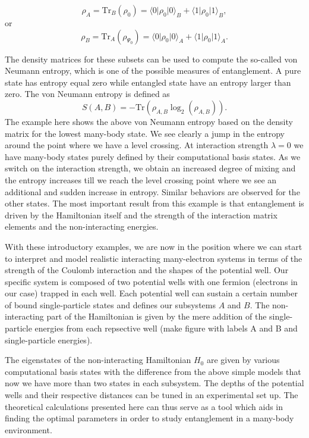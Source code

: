 \documentclass[twocolumn,superscriptaddress,unsortedaddress,
 amsmath,amssymb,
 aps,
]{revtex4-2}
\begin{document}
\[
\rho_A=\mathrm{Tr}_B(\rho_{0})=\langle 0 \vert \rho_{0} \vert 0\rangle_{B}+\langle 1 \vert \rho_{0} \vert 1\rangle_{B},
\]
or
\[
\rho_B=\mathrm{Tr}_A(\rho_{\Psi_0})=\langle 0 \vert \rho_{0} \vert 0\rangle_{A}+\langle 1 \vert \rho_{0} \vert 1\rangle_{A}.
\]

The density matrices for these subsets can be used to compute the
so-called von Neumann entropy, which is one of the possible measures
of entanglement. A pure state has entropy equal zero while entangled
state have an entropy larger than zero. The von Neumann entropy is
defined as
\[
S(A,B)=-\mathrm{Tr}\left(\rho_{A,B}\log_2 (\rho_{A,B})\right).
\]
The example here shows the above von Neumann entropy based on the
density matrix for the lowest many-body state. We see clearly a jump
in the entropy around the point where we have a level crossing. At
interaction strength $\lambda=0$ we have many-body states purely
defined by their computational basis states. As we switch on the
interaction strength, we obtain an increased degree of mixing and the
entropy increases till we reach the level crossing point where we see
an additional and sudden increase in entropy. Similar behaviors are
observed for the other states. The most important result from this
example is that entanglement is driven by the Hamiltonian itself and
the strength of the interaction matrix elements and the
non-interacting energies.


With these introductory examples, we are now in the position where we
can start to interpret and model realistic interacting many-electron
systems in terms of the strength of the Coulomb interaction and the
shapes of the potential well. Our specific system is composed of two
potential wells with one fermion (electrons in our case) trapped in
each well.  Each potential well can sustain a certain number of bound
single-particle states and defines our subsystems $A$ and $B$. The
non-interacting part of the Hamiltonian is given by the mere addition
of the single-particle energies from each repsective well (make figure
with labels A and B and single-particle energies).

The eigenstates of the non-interacting Hamiltonian $H_0$ are given by
various computational basis states with the difference from the above
simple models that now we have more than two states in each
subsystem. The depths of the potential wells and their respective
distances can be tuned in an experimental set up. The theoretical
calculations presented here can thus serve as a tool which aids in
finding the optimal parameters in order to study entanglement in a
many-body environment.
\end{document}
